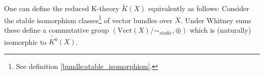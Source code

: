 	
	\begin{adefinition}
		One can define the reduced K-theory $\widetilde{K}(X)$ equivalently as follows: Consider the stable isomorphism classes\footnote{See definition \ref{bundle:stable_isomorphism}.} of vector bundles over $X$. Under Whitney sums these define a commutative group $(\text{Vect}(X)/\sim_{stable}, \oplus)$ which is (naturally) isomorphic to $\widetilde{K^0}(X)$.
	\end{adefinition}
